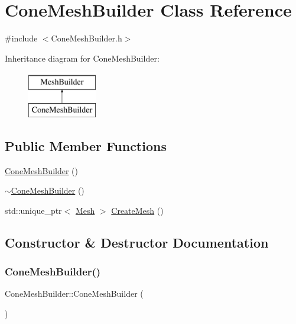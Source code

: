 \hypertarget{class_cone_mesh_builder}{}\section{Cone\+Mesh\+Builder Class Reference}
\label{class_cone_mesh_builder}


{\ttfamily \#include $<$Cone\+Mesh\+Builder.\+h$>$}

Inheritance diagram for Cone\+Mesh\+Builder\+:\begin{figure}[H]
\begin{center}
\leavevmode
\includegraphics[height=2.000000cm]{class_cone_mesh_builder}
\end{center}
\end{figure}
\subsection*{Public Member Functions}
\begin{DoxyCompactItemize}
\item 
\mbox{\hyperlink{class_cone_mesh_builder_adc58ede74fd626270bd0ddbab9acf7f7}{Cone\+Mesh\+Builder}} ()
\item 
\mbox{\hyperlink{class_cone_mesh_builder_a2f82f490e4331a1489d60a9e50ed20c8}{$\sim$\+Cone\+Mesh\+Builder}} ()
\item 
std\+::unique\+\_\+ptr$<$ \mbox{\hyperlink{class_mesh}{Mesh}} $>$ \mbox{\hyperlink{class_cone_mesh_builder_a19a21fdb3432d350817df21315a5f93e}{Create\+Mesh}} ()
\end{DoxyCompactItemize}


\subsection{Constructor \& Destructor Documentation}
\mbox{\label{class_cone_mesh_builder_adc58ede74fd626270bd0ddbab9acf7f7}} 
\subsubsection{\texorpdfstring{ConeMeshBuilder()}{ConeMeshBuilder()}}
{\footnotesize\ttfamily Cone\+Mesh\+Builder\+::\+Cone\+Mesh\+Builder (\begin{DoxyParamCaption}{ }\end{DoxyParamCaption})}

